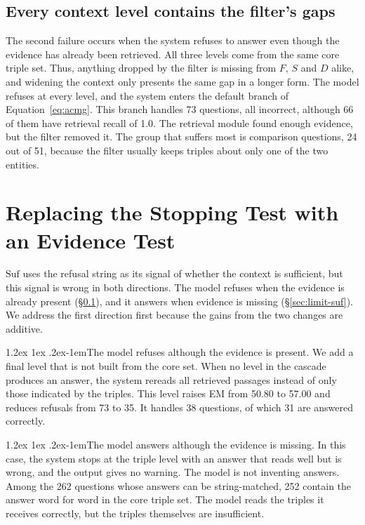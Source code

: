 \documentclass[11pt]{article}
\makeatletter
\renewcommand\paragraph{\@startsection{paragraph}{4}{\z@}%
  {1.2ex \@plus1ex \@minus.2ex}{-1em}{\normalfont\normalsize\bfseries}}
\makeatother
\begin{document}
\subsection{Every context level contains the filter's gaps}
\label{sec:limit-empty}

The second failure occurs when the system refuses to answer even though the evidence has
already been retrieved. All three levels come from the same core triple set. Thus, anything
dropped by the filter is missing from $F$, $S$ and $D$ alike, and widening the context only
presents the same gap in a longer form. The model refuses at every level, and the system
enters the default branch of Equation~\ref{eq:acmg}. This branch handles 73 questions, all
incorrect, although 66 of them have retrieval recall of 1.0. The retrieval module found
enough evidence, but the filter removed it. The group that suffers most is comparison
questions, 24 out of 51, because the filter usually keeps triples about only one of the two
entities.

\section{Replacing the Stopping Test with an Evidence Test}
\label{sec:fix}

$\mathrm{Suf}$ uses the refusal string as its signal of whether the context is sufficient,
but this signal is wrong in both directions. The model refuses when the evidence is already
present (\S\ref{sec:limit-empty}), and it answers when evidence is missing
(\S\ref{sec:limit-suf}). We address the first direction first because the gains from the two
changes are additive.

\paragraph{The model refuses although the evidence is present.} We add a final level that is
not built from the core set. When no level in the cascade produces an answer, the system
rereads all retrieved passages instead of only those indicated by the triples. This level
raises EM from 50.80 to 57.00 and reduces refusals from 73 to 35. It handles 38 questions, of which 31 are answered
correctly.

\paragraph{The model answers although the evidence is missing.} In this case, the system
stops at the triple level with an answer that reads well but is wrong, and the output gives
no warning. The model is not inventing answers. Among the 262 questions whose answers can be
string-matched, 252 contain the answer word for word in the core triple set. The model reads
the triples it receives correctly, but the triples themselves are insufficient.
\end{document}
